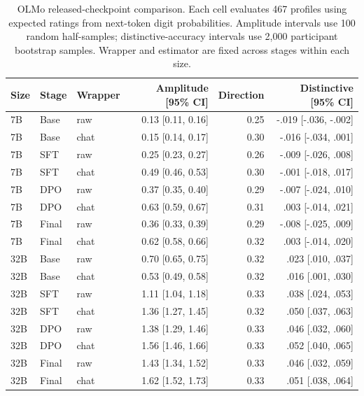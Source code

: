 \begin{table}[p]
\centering\small
\begin{tabular}{@{}lllrrr@{}}
\toprule
Size & Stage & Wrapper & Amplitude [95\% CI] & Direction & Distinctive [95\% CI]\\
\midrule
7B & Base & raw & 0.13 [0.11, 0.16] & 0.25 & -.019 [-.036, -.002]\\
7B & Base & chat & 0.15 [0.14, 0.17] & 0.30 & -.016 [-.034, .001]\\
7B & SFT & raw & 0.25 [0.23, 0.27] & 0.26 & -.009 [-.026, .008]\\
7B & SFT & chat & 0.49 [0.46, 0.53] & 0.30 & -.001 [-.018, .017]\\
7B & DPO & raw & 0.37 [0.35, 0.40] & 0.29 & -.007 [-.024, .010]\\
7B & DPO & chat & 0.63 [0.59, 0.67] & 0.31 & .003 [-.014, .021]\\
7B & Final & raw & 0.36 [0.33, 0.39] & 0.29 & -.008 [-.025, .009]\\
7B & Final & chat & 0.62 [0.58, 0.66] & 0.32 & .003 [-.014, .020]\\
\midrule
32B & Base & raw & 0.70 [0.65, 0.75] & 0.32 & .023 [.010, .037]\\
32B & Base & chat & 0.53 [0.49, 0.58] & 0.32 & .016 [.001, .030]\\
32B & SFT & raw & 1.11 [1.04, 1.18] & 0.33 & .038 [.024, .053]\\
32B & SFT & chat & 1.36 [1.27, 1.45] & 0.32 & .050 [.037, .063]\\
32B & DPO & raw & 1.38 [1.29, 1.46] & 0.33 & .046 [.032, .060]\\
32B & DPO & chat & 1.56 [1.46, 1.66] & 0.33 & .052 [.040, .065]\\
32B & Final & raw & 1.43 [1.34, 1.52] & 0.33 & .046 [.032, .059]\\
32B & Final & chat & 1.62 [1.52, 1.73] & 0.33 & .051 [.038, .064]\\
\bottomrule
\end{tabular}
\caption{OLMo released-checkpoint comparison. Each cell evaluates 467 profiles using expected ratings from next-token digit probabilities. Amplitude intervals use 100 random half-samples; distinctive-accuracy intervals use 2,000 participant bootstrap samples. Wrapper and estimator are fixed across stages within each size.}
\label{tab:olmo_ready}
\end{table}
